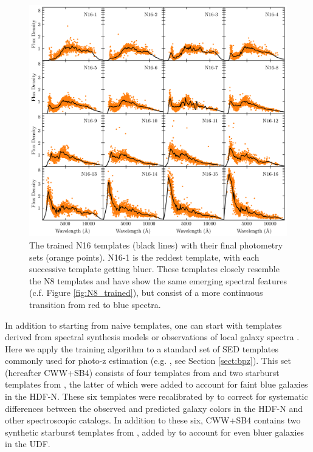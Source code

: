 \begin{figure}
    \centering
    \includegraphics{figures/N16_trained.png}
    \caption{The trained N16 templates (black lines) with their final photometry sets (orange points). N16-1 is the reddest template, with each successive template getting bluer. These templates closely resemble the N8 templates and have show the same emerging spectral features (c.f. Figure \ref{fig:N8_trained}), but consist of a more continuous transition from red to blue spectra.}
    \label{fig:N16_trained}
\end{figure}

In addition to starting from naive templates, one can start with templates derived from spectral synthesis models or observations of local galaxy spectra \citep{Budavari2000b, Csabai2000}.
Here we apply the training algorithm to a standard set of SED templates commonly used for photo-z estimation (e.g. \bpz, see Section \ref{sect:bpz}).
This set (hereafter CWW+SB4) consists of four templates from \citet{Coleman1980a} and two starburst templates from \citet{Kinney1996a}, the latter of which were added to account for faint blue galaxies in the HDF-N. 
These six templates were recalibrated by \citet{Benitez2004a} to correct for systematic differences between the observed and predicted galaxy colors in the HDF-N and other spectroscopic catalogs. 
In addition to these six, CWW+SB4 contains two synthetic starburst templates from \citet{Bruzual2003b}, added by \citet{Coe2006a} to account for even bluer galaxies in the UDF.

